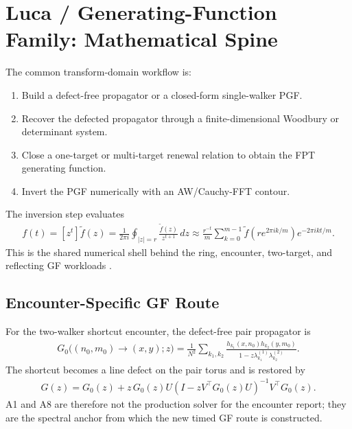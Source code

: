 \documentclass[11pt]{article}
\begin{document}
\section{Luca / Generating-Function Family: Mathematical Spine}
The common transform-domain workflow is:
\begin{enumerate}[leftmargin=1.5em]
\item Build a defect-free propagator or a closed-form single-walker PGF.
\item Recover the defected propagator through a finite-dimensional Woodbury or determinant system.
\item Close a one-target or multi-target renewal relation to obtain the FPT generating function.
\item Invert the PGF numerically with an AW/Cauchy-FFT contour.
\end{enumerate}
The inversion step evaluates
\begin{align}
f(t) = [z^t]\widetilde f(z) = \frac{1}{2\pi i}\oint_{|z|=r} \frac{\widetilde f(z)}{z^{t+1}}\,dz
\approx \frac{r^{-t}}{m}\sum_{k=0}^{m-1}\widetilde f\!\left(re^{2\pi i k/m}\right)e^{-2\pi i kt/m}.
\end{align}
This is the shared numerical shell behind the ring, encounter, two-target, and reflecting GF workloads \cite{abate_whitt_2006}.
\subsection{Encounter-Specific GF Route}
For the two-walker shortcut encounter, the defect-free pair propagator is
\begin{align}
G_0\big((n_0,m_0)\to(x,y);z\big)=\frac{1}{N^2}\sum_{k_1,k_2}\frac{h_{k_1}(x,n_0)h_{k_2}(y,m_0)}{1-z\lambda_{k_1}^{(1)}\lambda_{k_2}^{(2)}}.
\end{align}
The shortcut becomes a line defect on the pair torus and is restored by
\begin{align}
G(z)=G_0(z)+z\,G_0(z)U\left(I-zV^{\top}G_0(z)U\right)^{-1}V^{\top}G_0(z).
\end{align}
A1 and A8 are therefore not the production solver for the encounter report; they are the spectral anchor from which the new timed GF route is constructed.
\end{document}
